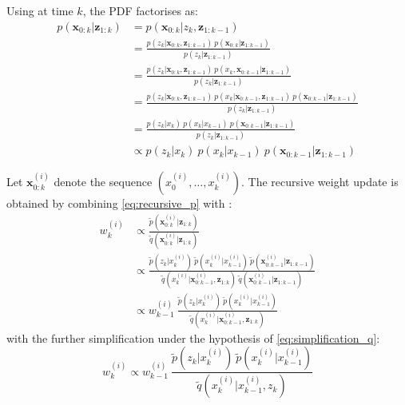 Using  at time $k$, the PDF factorises as:
\begin{equation}
	\begin{aligned}
		p(\mathbf{x}_{0:k}|\mathbf{z}_{1:k})&=p(\mathbf{x}_{0:k}|z_k,\mathbf{z}_{1:k-1})\\
		&=\frac{p(z_k|\mathbf{x}_{0:k},\mathbf{z}_{1:k-1})\:p(\mathbf{x}_{0:k}|\mathbf{z}_{1:k-1})}{p(z_k|\mathbf{z}_{1:k-1})}\\
		&=\frac{p(z_k|\mathbf{x}_{0:k},\mathbf{z}_{1:k-1})\:p(x_k,\mathbf{x}_{0:k-1}|\mathbf{z}_{1:k-1})}{p(z_k|\mathbf{z}_{1:k-1})}\\
		&=\frac{p(z_k|\mathbf{x}_{0:k},\mathbf{z}_{1:k-1})\:p(x_k|\mathbf{x}_{0:k-1},\mathbf{z}_{1:k-1})\:p(\mathbf{x}_{0:k-1}|\mathbf{z}_{1:k-1})}{p(z_k|\mathbf{z}_{1:k-1})}\\
		&=\frac{p(z_k|x_k)\:p(x_k|x_{k-1})\:p(\mathbf{x}_{0:k-1}|\mathbf{z}_{1:k-1})}{p(z_k|\mathbf{z}_{1:k-1})}\\
		&\propto p(z_k|x_k)\:p(x_k|x_{k-1})\:p(\mathbf{x}_{0:k-1}|\mathbf{z}_{1:k-1})
	\end{aligned}\label{eq:recursive_p}
\end{equation}

Let $\mathbf{x}_{0:k}^{(i)}$ denote the sequence $\left(x_0^{(i)},\dots,x_k^{(i)}\right)$. The recursive weight update is obtained by combining \eqref{eq:recursive_p} with :
\begin{equation}
	\begin{aligned}
	w_k^{(i)}&\propto\frac{\tilde{p}\left(\mathbf{x}_{0:k}^{(i)}|\mathbf{z}_{1:k}\right)}{\tilde{q}\left(\mathbf{x}_{0:k}^{(i)}|\mathbf{z}_{1:k}\right)}\\
	&\propto\frac{\tilde{p}\left(z_k|x_k^{(i)}\right)\:\tilde{p}\left(x_k^{(i)}|x_{k-1}^{(i)}\right)\:\tilde{p}\left(\mathbf{x}_{0:k-1}^{(i)}|\mathbf{z}_{1:k-1}\right)}{\tilde{q}\left(x_k^{(i)}|\mathbf{x}_{0:k-1}^{(i)},\mathbf{z}_{1:k}\right)\:\tilde{q}\left(\mathbf{x}_{0:k-1}^{(i)}|\mathbf{z}_{1:k-1}\right)}\\
	&\propto w_{k-1}^{(i)}\:\frac{\tilde{p}\left(z_k|x_k^{(i)}\right)\:\tilde{p}\left(x_k^{(i)}|x_{k-1}^{(i)}\right)}{\tilde{q}\left(x_k^{(i)}|\mathbf{x}_{0:k-1}^{(i)},\mathbf{z}_{1:k}\right)}
	\end{aligned}\label{eq:weight_update}
\end{equation}
with the further simplification under the hypothesis of \eqref{eq:simplification_q}:
\begin{equation}
	w_k^{(i)}\propto w_{k-1}^{(i)}\:\frac{\tilde{p}\left(z_k|x_k^{(i)}\right)\:\tilde{p}\left(x_k^{(i)}|x_{k-1}^{(i)}\right)}{\tilde{q}\left(x_k^{(i)}|x_{k-1}^{(i)},z_k\right)}
\end{equation}


